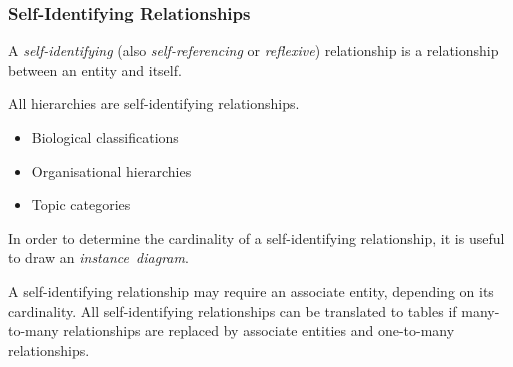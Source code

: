 
\subsubsection{Self-Identifying Relationships}

A \emph{self-identifying} (also \emph{self-referencing} or \emph{reflexive}) relationship is a relationship between an entity and itself.


All hierarchies are self-identifying relationships.
\begin{itemize}
  \item Biological classifications
  \item Organisational hierarchies
  \item Topic categories
\end{itemize}

In order to determine the cardinality of a self-identifying relationship, it is useful to draw an \emph{instance~diagram}.


A self-identifying relationship may require an associate entity, depending on its cardinality.
All self-identifying relationships can be translated to tables if many-to-many relationships are replaced by associate entities and one-to-many relationships.
